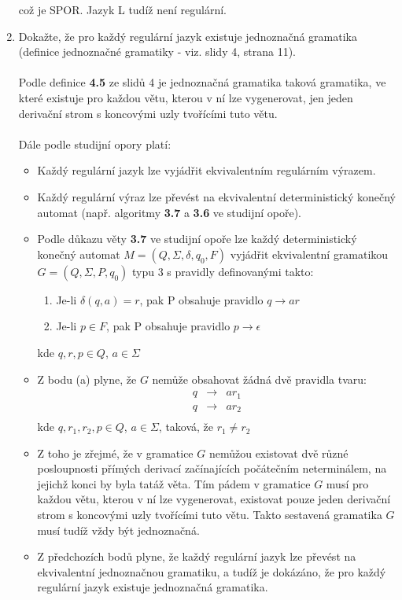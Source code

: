 \documentclass[a4paper,11pt]{article}[24.3.2010]
\begin{document}
\begin{enumerate}
což je SPOR. Jazyk L tudíž není regulární.\newpage


\item Dokažte, že pro každý regulární jazyk existuje jednoznačná gramatika (definice jednoznačné gramatiky - viz. slidy 4, strana 11).\\\\
Podle definice \textbf{4.5} ze slidů 4 je jednoznačná gramatika taková gramatika, ve které existuje pro každou větu, kterou v ní lze vygenerovat, jen jeden derivační strom s koncovými uzly tvořícími tuto větu.\\\\
Dále podle studijní opory platí:\\
\begin{itemize}
\item Každý regulární jazyk lze vyjádřit ekvivalentním regulárním výrazem.\\
\item Každý regulární výraz lze převést na ekvivalentní deterministický konečný automat (např. algoritmy \textbf{3.7} a \textbf{3.6} ve studijní opoře).\\
\item Podle důkazu věty \textbf{3.7} ve studijní opoře lze každý deterministický konečný automat $M=(Q, \Sigma, \delta, q_{0}, F)$ vyjádřit ekvivalentní gramatikou $G=(Q, \Sigma, P, q_{0})$ typu 3 s pravidly definovanými takto:\\
\begin{enumerate}
      \item Je-li $\delta(q,a)=r$, pak P obsahuje pravidlo $q\rightarrow ar$
      \item Je-li $p \in F$, pak P obsahuje pravidlo $p\rightarrow \epsilon$\\
\end{enumerate}
kde $q,r,p \in Q$, $a \in \Sigma$\\
\item Z bodu (a) plyne, že $G$ nemůže obsahovat žádná dvě pravidla tvaru:
\begin{eqnarray*}
      q&\rightarrow&ar_{1}\\
      q&\rightarrow&ar_{2}\\
\end{eqnarray*}
kde $q,r_{1},r_{2},p \in Q$, $a \in \Sigma$, taková, že $r_{1}\neq r_{2}$\\
\item Z toho je zřejmé, že v gramatice $G$ nemůžou existovat dvě různé posloupnosti přímých derivací začínajících počátečním neterminálem, na jejichž konci by byla tatáž věta.  Tím pádem v gramatice $G$ musí pro každou větu, kterou v ní lze vygenerovat, existovat pouze jeden derivační strom s koncovými uzly tvořícími tuto větu. Takto sestavená gramatika $G$ musí tudíž vždy být jednoznačná. \\
\item Z předchozích bodů plyne, že každý regulární jazyk lze převést na ekvivalentní jednoznačnou gramatiku, a tudíž je dokázáno, že pro každý regulární jazyk existuje jednoznačná gramatika.
\end{itemize}




 

\end{enumerate}
\end{document}
